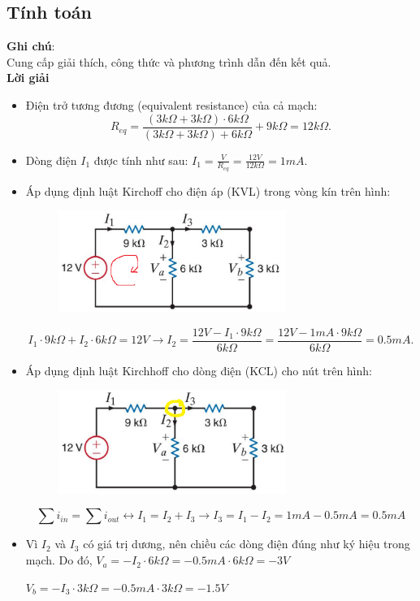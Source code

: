 \subsection{Tính toán}
\textbf{Ghi chú}:\\
Cung cấp giải thích, công thức và phương trình dẫn đến kết quả.\\
\textbf{Lời giải}\\
\begin{itemize}
    \item Điện trở tương đương (equivalent resistance) của cả mạch:
    \[
    R_{eq} = \frac{(3k\Omega + 3k\Omega) \cdot 6k\Omega}{(3k\Omega + 3k\Omega) + 6k\Omega} + 9k\Omega = 12k\Omega.
    \]
    \item Dòng điện \(I_1\) được tính như sau: \(I_1 = \frac{V}{R_{eq}} = \frac{12V}{12k\Omega} = 1 mA.\)
    \item Áp dụng định luật Kirchoff cho điện áp (KVL) trong vòng kín trên hình: 
    \begin{figure}[!htbp]
        \centering
        \includegraphics[width=0.7\textwidth]{graphics/ex4/f1a.png}
    \end{figure}
    \[
    I_1 \cdot 9k\Omega + I_2 \cdot 6k\Omega = 12V
    \longrightarrow I_2 = \frac{12V -  I_1 \cdot 9k\Omega }{6k\Omega} = \frac{12V -  1mA \cdot 9k\Omega }{6k\Omega} = 0.5 mA.
    \]
    \newpage
    \item Áp dụng định luật Kirchhoff cho dòng điện (KCL) cho nút trên hình:
    \begin{figure}[!htbp]
        \centering
        \includegraphics[width=0.7\textwidth]{graphics/ex4/f1b.png}
    \end{figure}
    \[
    \displaystyle \sum i_{in} = \sum i_{out}
    \longleftrightarrow I_1 = I_2 + I_3
    \longrightarrow I_3 = I_1 - I_2 = 1mA - 0.5mA = 0.5mA
    \]
    \item Vì \(I_2\) và \(I_3\) có giá trị dương, nên chiều các dòng điện đúng như ký hiệu trong mạch. Do đó, 
    \(V_a = -I_2 \cdot 6k\Omega = - 0.5mA \cdot 6k\Omega = -3V\)

    \(V_b = -I_3 \cdot 3k\Omega = - 0.5mA \cdot 3k\Omega = -1.5V\) 
\end{itemize}

